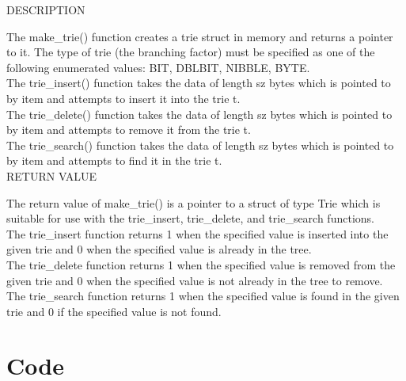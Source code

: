 \documentclass{llncs}
\begin{document}
\noindent DESCRIPTION

\noindent The make\_trie() function creates a trie struct in memory and returns a pointer to it. The type of trie (the branching factor) must be specified as one of the following enumerated values: BIT, DBLBIT, NIBBLE, BYTE.\\
The trie\_insert() function takes the data of length sz bytes which is pointed to by item and attempts to insert it into the trie t.\\
The trie\_delete() function takes the data of length sz bytes which is pointed to by item and attempts to remove it from the trie t.\\
The trie\_search() function takes the data of length sz bytes which is pointed to by item and attempts to find it in the trie t.\\

\noindent RETURN VALUE

\noindent The return value of make\_trie() is a pointer to a struct of type Trie which is suitable for use with the trie\_insert, trie\_delete, and trie\_search functions.\\
The trie\_insert function returns 1 when the specified value is inserted into the given trie and 0 when the specified value is already in the tree.\\
The trie\_delete function returns 1 when the specified value is removed from the given trie and 0 when the specified value is not already in the tree to remove.\\
The trie\_search function returns 1 when the specified value is found in the given trie and 0 if the specified value is not found.\\

\newpage
\section{Code}

\newpage

\end{document}
